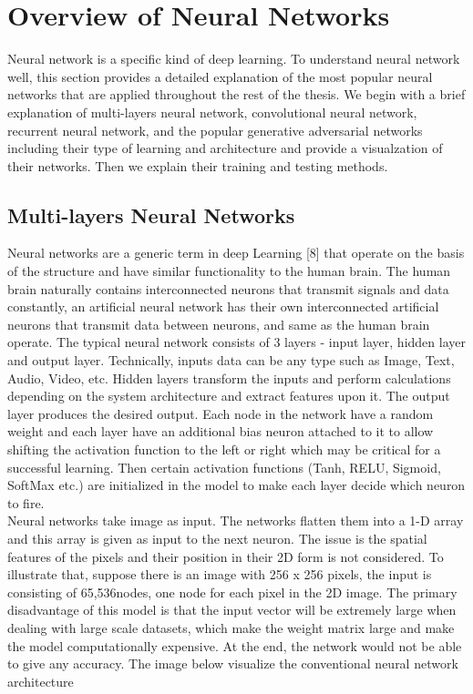 \section{Overview of Neural Networks}
\hspace{5mm} Neural network is a specific kind of deep learning. To understand neural network well, this section provides a detailed explanation of the most popular neural networks that are applied throughout the rest of the thesis. We begin with a brief explanation of multi-layers neural network, convolutional neural network, recurrent neural network, and the popular generative adversarial networks including their type of learning and architecture and provide a visualzation of their networks. Then we explain their training and testing methods.
\subsection{Multi-layers Neural Networks}
\hspace{5mm} Neural networks are a generic term in deep Learning [8] that operate on the basis of the structure and have similar functionality to the human brain. The human brain naturally contains interconnected neurons that transmit signals and data constantly, an artificial neural network has their own interconnected artificial neurons that transmit data between neurons, and same as the human brain operate. The typical neural network consists of 3 layers - input layer, hidden layer and output layer. Technically, inputs data can be any type such as Image, Text, Audio, Video, etc. Hidden layers transform the inputs and perform calculations depending on the system architecture and extract features upon it. The output layer produces the desired output. Each node in the network have a random weight and each layer have an additional bias neuron attached to it to allow shifting the activation function to the left or right which may be critical for a successful learning. Then certain activation functions (Tanh, RELU, Sigmoid, SoftMax etc.) are initialized in the model to make each layer decide which neuron to fire.\\
Neural networks take image as input. The networks flatten them into a 1-D array and this array is given as input to the next neuron. The issue is the spatial features of the pixels and their position in their 2D form is not considered. To illustrate that, suppose there is an image with 256 x 256 pixels, the input is consisting of 65,536nodes, one node for each pixel in the 2D image. The primary disadvantage of this model is that the input vector will be extremely large when dealing with large scale datasets, which make the weight matrix large and make the model computationally expensive. At the end, the network would not be able to give any accuracy. The image below visualize the conventional neural network architecture 
